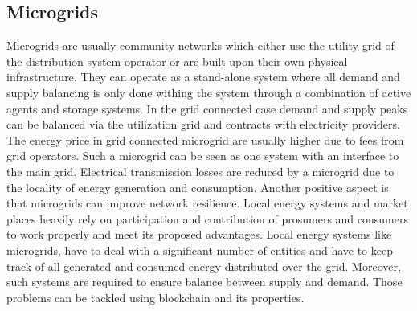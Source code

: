 \documentclass[runningheads]{llncs}
\begin{document}
\subsection{Microgrids}
Microgrids are usually community networks which either use the utility grid of the distribution system operator or are built upon their own physical infrastructure. They can operate as a stand-alone system where all demand and supply balancing is only done withing the system through a combination of active agents and storage systems. In the grid connected case demand and supply peaks can be balanced via the utilization grid and contracts with electricity providers. The energy price in grid connected microgrid are usually higher due to fees from grid operators. \cite{zia_microgrid_te} \newline
Such a microgrid can be seen as one system with an interface to the main grid. Electrical transmission losses are reduced by a microgrid due to the locality of energy generation and consumption. Another positive aspect is that microgrids can improve network resilience. Local energy systems and market places heavily rely on participation and contribution of prosumers and consumers to work properly and meet its proposed advantages.
Local energy systems like microgrids, have to deal with a significant number of entities and have to keep track of all generated and consumed energy distributed over the grid. Moreover, such systems are required to ensure balance between supply and demand. Those problems can be tackled using blockchain and its properties. \cite{andoni_energy_bc_review}
\end{document}
